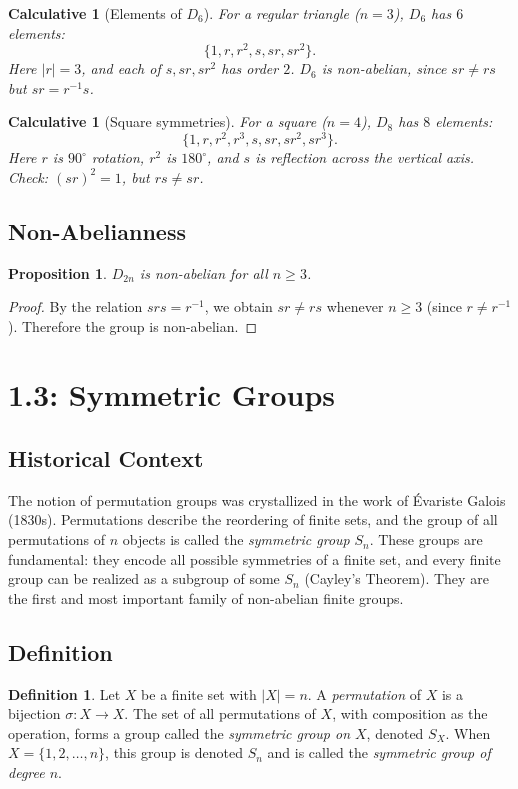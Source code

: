 \documentclass[12pt]{article}
\newtheorem{proposition}[theorem]{Proposition}
\newtheorem{calculative}[theorem]{Calculative}
\theoremstyle{definition}
\newtheorem{definition}{Definition}
\begin{document}
\begin{calculative}[Elements of $D_6$]
For a regular triangle ($n=3$), $D_6$ has $6$ elements:
\[
\{1,r,r^2,s,sr,sr^2\}.
\]
Here $|r|=3$, and each of $s,sr,sr^2$ has order $2$. $D_6$ is non-abelian, since
$sr \neq rs$ but $sr = r^{-1}s$.
\end{calculative}

\begin{calculative}[Square symmetries]
For a square ($n=4$), $D_8$ has $8$ elements:
\[
\{1,r,r^2,r^3,s,sr,sr^2,sr^3\}.
\]
Here $r$ is $90^\circ$ rotation, $r^2$ is $180^\circ$, and $s$ is reflection across the vertical axis.
Check: $(sr)^2=1$, but $rs\neq sr$.
\end{calculative}

\subsection*{Non-Abelianness}
\begin{proposition}
$D_{2n}$ is non-abelian for all $n\geq 3$.
\end{proposition}

\begin{proof}
By the relation $srs=r^{-1}$, we obtain $sr\neq rs$ whenever $n\geq 3$ (since $r\neq r^{-1}$).
Therefore the group is non-abelian.
\end{proof}

\newpage

\dotfill
\section*{1.3: Symmetric Groups}
\dotfill

\subsection*{Historical Context}
The notion of permutation groups was crystallized in the work of Évariste Galois (1830s).
Permutations describe the reordering of finite sets, and the group of all permutations
of $n$ objects is called the \emph{symmetric group} $S_n$.
These groups are fundamental: they encode all possible symmetries of a finite set,
and every finite group can be realized as a subgroup of some $S_n$ (Cayley’s Theorem).
They are the first and most important family of non-abelian finite groups.

\subsection*{Definition}
\begin{definition}
Let $X$ be a finite set with $|X|=n$. A \emph{permutation} of $X$ is a bijection $\sigma\colon X\to X$.
The set of all permutations of $X$, with composition as the operation, forms a group called the
\emph{symmetric group on $X$}, denoted $S_X$.
When $X=\{1,2,\dots,n\}$, this group is denoted $S_n$ and is called the \emph{symmetric group of degree $n$}.
\end{definition}
\end{document}
